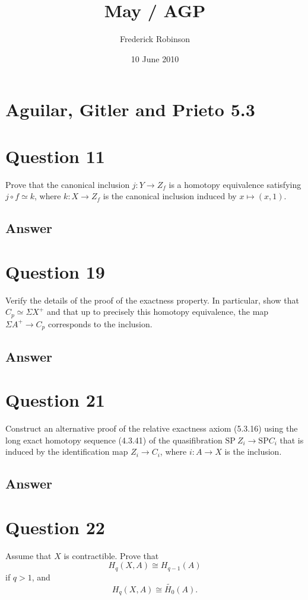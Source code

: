 \documentclass[11pt]{article}
\begin{document}



\title{May / AGP}
\author{Frederick Robinson}
\date{10 June 2010}
\maketitle


\section*{Aguilar, Gitler and Prieto 5.3}
\section{Question 11}
Prove that the canonical inclusion $j : Y \to Z_f$ is a homotopy equivalence satisfying $j \circ f \simeq k $, where $k: X \to Z_f$ is the canonical inclusion induced by $x \mapsto (x,1)$.
\subsection{Answer}

\section{Question 19}
Verify the details of the proof of the exactness property. In particular, show that $C_p \simeq \Sigma X^+ $ and that up to precisely this homotopy equivalence, the map $\Sigma A^+ \to C_p$ corresponds to the inclusion.
\subsection{Answer}

\section{Question 21}
Construct an alternative proof of the relative exactness axiom (5.3.16) using the long exact homotopy sequence (4.3.41) of the quasifibration $\mathrm{SP }\ Z_i \to \mathrm{SP } C_i$ that is induced by the identification map $Z_i \to C_i$, where $i : A \to X$ is the inclusion.
\subsection{Answer}


\section{Question 22}
Assume that $X$ is contractible. Prove that
\[H_q(X,A) \cong H_{q-1}(A) \]
if $q>1$, and
\[H_q(X,A) \cong \tilde{H_0} (A).\]
\end{document}
